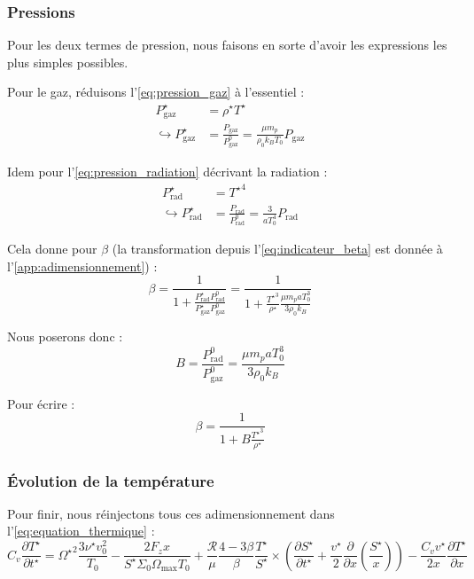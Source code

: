 \subsubsection{Pressions}

Pour les deux termes de pression, nous faisons en sorte d’avoir les expressions
les plus simples possibles.

Pour le gaz, réduisons l’\cref{eq:pression_gaz} à l’essentiel :
\begin{align}
    P_\mathrm{gaz}^\star &= \rho^\star T^\star \\ 
    \hookrightarrow P_\mathrm{gaz}^\star &= \frac{P_\mathrm{gaz}}{P_\mathrm{gaz}^0} = \frac{\mu m_p}{\rho_0 k_B T_0} P_\mathrm{gaz}
\end{align}

Idem pour l’\cref{eq:pression_radiation} décrivant la radiation :
\begin{align}
    P_\mathrm{rad}^\star &= {T^\star}^4 \\
    \hookrightarrow P_\mathrm{rad}^\star &= \frac{P_\mathrm{rad}}{P_\mathrm{rad}^0} = \frac{3}{a T_0^4} P_\mathrm{rad}
\end{align}

Cela donne pour $\beta$ (la transformation depuis
l’\cref{eq:indicateur_beta} est donnée à l’\cref{app:adimensionnement}) :
\begin{equation}
    \beta = \frac{1}{1 + \frac{P_\mathrm{rad}^\star P_\mathrm{rad}^0}{P_\mathrm{gaz}^\star P_\mathrm{gaz}^0}} = \frac{1}{1 + \frac{{T^\star}^3}{\rho^\star} \frac{\mu m_p a T_0^3}{3 \rho_0 k_B}}
\end{equation}

Nous poserons donc :
\begin{equation}
    B = \frac{P_\mathrm{rad}^0}{P_\mathrm{gaz}^0} = \frac{\mu m_p a T_0^3}{3 \rho_0 k_B}
\end{equation}

Pour écrire :
\begin{equation}
    \beta = \frac{1}{1 + B \frac{{T^\star}^3}{\rho^\star}}
\end{equation}

\subsubsection{Évolution de la température}

Pour finir, nous réinjectons tous ces adimensionnement dans
l’\cref{eq:equation_thermique} :
\begin{equation}
    C_v \frac{\partial T^{\star}}{\partial t^{\star}} =
    {\Omega^\star}^2 \frac{3 \nu^\star v_0^2}{T_0} -
    \frac{2 F_z x}{S^\star \Sigma_0 \Omega_\mathrm{max} T_0} +
    \frac{\mathcal{R}}{\mu} \frac{4-3\beta}{\beta} \frac{T^\star}{S^\star} \times
    \left( \frac{\partial S^\star}{\partial t^\star} + \frac{v^\star}{2} \frac{\partial}{\partial x} \left(\frac{S^\star}{x}\right) \right) -
    \frac{C_v v^\star}{2 x} \frac{\partial T^\star}{\partial x}
\end{equation}

